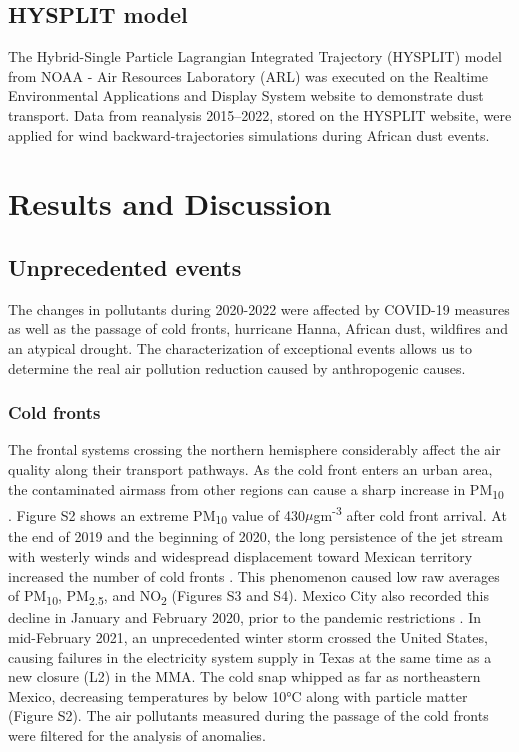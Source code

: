 \documentclass[preprint,12pt]{elsarticle}
\begin{document}
\subsection*{HYSPLIT model}
The Hybrid-Single Particle Lagrangian Integrated Trajectory (HYSPLIT) model from NOAA - Air Resources Laboratory (ARL) \citep{Stein_2015} was executed on the Realtime Environmental Applications and Display System website to demonstrate dust transport. Data from reanalysis 2015–2022, stored on the HYSPLIT website, were applied for wind backward-trajectories simulations during African dust events.
\section*{Results and Discussion}
\subsection*{Unprecedented events}
The changes in pollutants during 2020-2022 were affected by COVID-19 measures as well as the passage of cold fronts, hurricane Hanna, African dust, wildfires and an atypical drought. The characterization of exceptional events allows us to determine the real air pollution reduction caused by anthropogenic causes.
\subsubsection*{Cold fronts}
The frontal systems crossing the northern hemisphere considerably affect the air quality along their transport pathways. As the cold front enters an urban area, the contaminated airmass from other regions can cause a sharp increase in PM\textsubscript{10} \citep{Kang_2019}. Figure S2 shows an extreme PM\textsubscript{10} value of 430$\mu$gm\textsuperscript{-3} after cold front arrival. At the end of 2019 and the beginning of 2020, the long persistence of the jet stream with westerly winds and widespread displacement toward Mexican territory increased the number of cold fronts \citep{yucatn}. This phenomenon caused low raw averages of PM\textsubscript{10}, PM\textsubscript{2.5}, and NO\textsubscript{2} (Figures S3 and S4). Mexico City also recorded this decline in January and February 2020, prior to the pandemic restrictions \citep{Vega_2021}. In mid-February 2021, an unprecedented winter storm crossed the United States, causing failures in the electricity system supply in Texas \citep{Doss_Gollin_2021,years} at the same time as a new closure (L2) in the MMA. The cold snap whipped as far as northeastern Mexico, decreasing temperatures by below 10°C along with particle matter (Figure S2). The air pollutants measured during the passage of the cold fronts were filtered for the analysis of anomalies.
\end{document}
